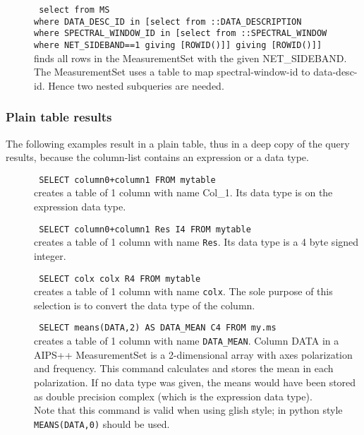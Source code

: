 \begin{description}
  \item[] \texttt{ select from MS}
      \\\texttt{where DATA\_DESC\_ID in [select from ::DATA\_DESCRIPTION}
      \\\texttt{where SPECTRAL\_WINDOW\_ID in [select from ::SPECTRAL\_WINDOW}
      \\\texttt{where NET\_SIDEBAND==1 giving [ROWID()]] giving [ROWID()]]}
      \\finds all rows in the MeasurementSet with the given
      NET\_SIDEBAND.
      \\The MeasurementSet uses a table to map spectral-window-id to
      data-desc-id. Hence two nested subqueries are needed.
\end{description}

\subsubsection{Plain table results}
The following examples result in a plain table, thus in a deep copy of
the query results, because the column-list contains an expression or
a data type.
\begin{description}
  \item[] \texttt{ SELECT column0+column1 FROM mytable }
    \\creates a table of 1 column with name Col\_1. Its data type
      is on the expression data type.

  \item[] \texttt{ SELECT column0+column1 Res I4 FROM mytable }
    \\creates a table of 1 column with name \texttt{Res}.
      Its data type is a 4 byte signed integer.

  \item[] \texttt{ SELECT colx colx R4 FROM mytable }
    \\creates a table of 1 column with name \texttt{colx}.
      The sole purpose of this selection is to convert the data type
      of the column.

  \item[] \texttt{ SELECT means(DATA,2) AS DATA\_MEAN C4 FROM my.ms }
    \\creates a table of 1 column with name \texttt{DATA\_MEAN}.
      Column DATA in a AIPS++ MeasurementSet is a 2-dimensional array
      with axes polarization and frequency. This command calculates
      and stores the mean in each polarization.
      If no data type was given, the means would have been stored
      as double precision complex (which is the expression data type).
      \\Note that this command is valid when using glish style; in
      python style \texttt{MEANS(DATA,0)} should be used.

\end{description}


